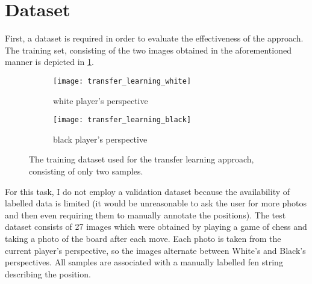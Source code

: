 \documentclass[../report.tex]{subfiles}
\begin{document}
\section{Dataset}
First, a dataset is required in order to evaluate the effectiveness of the approach.
The training set, consisting of the two images obtained in the aforementioned manner is depicted in \cref{fig:transfer_learning_train_data}.
\begin{figure}
    \centering
    \begin{subfigure}[b]{0.47\textwidth}
        \centering
        \texttt{[image: transfer\_learning\_white]}
        \caption{white player's perspective}
    \end{subfigure}
    \hfill
    \begin{subfigure}[b]{0.47\textwidth}
        \centering
        \texttt{[image: transfer\_learning\_black]}
        \caption{black player's perspective}
    \end{subfigure}
    \caption{The training dataset used for the transfer learning approach, consisting of only two samples.}
    \label{fig:transfer_learning_train_data}
\end{figure}
For this task, I do not employ a validation dataset because the availability of labelled data is limited (it would be unreasonable to ask the user for more photos and then even requiring them to manually annotate the positions).
The test dataset consists of 27 images which were obtained by playing a game of chess and taking a photo of the board after each move.
Each photo is taken from the current player's perspective, so the images alternate between White's and Black's perspectives.
All samples are associated with a manually labelled \gls{fen} string describing the position.
\end{document}
